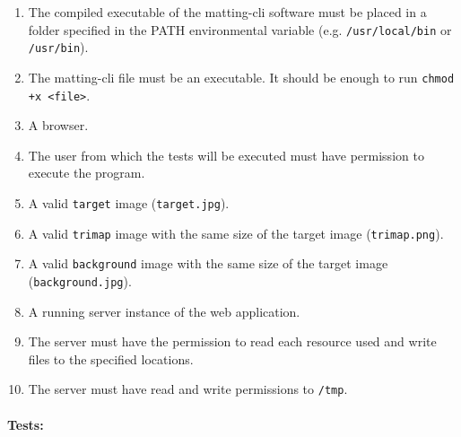 \documentclass[a4paper]{article}
\begin{document}
\begin{enumerate}
    \item The compiled executable of the matting-cli software
    must be placed in a folder specified in the \textsc{PATH}
    environmental variable (e.g. \texttt{/usr/local/bin} or \texttt{/usr/bin}).
    \item The matting-cli file must be an executable. It should be enough to run
    \lstinline{chmod +x <file>}.
    \item A browser.
    \item The user from which the tests will be executed must have permission to execute
    the program.
    \item A valid \texttt{target} image (\texttt{target.jpg}).
    \item A valid \texttt{trimap} image with the same size of the target image (\texttt{trimap.png}).
    \item A valid \texttt{background} image with the same size of the target image (\texttt{background.jpg}).
    \item A running server instance of the web application.
    \item The server must have the permission to read each resource used and write files
    to the specified locations.
    \item The server must have read and write permissions to \texttt{/tmp}.
\end{enumerate}

\paragraph{Tests:}


\end{document}
